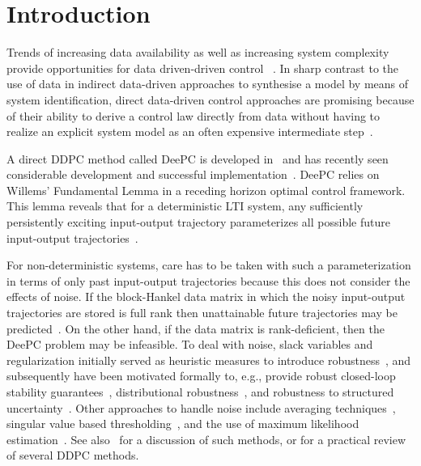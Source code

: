 \section{Introduction}\label{sec:introduction}
\noindent Trends of increasing data availability as well as increasing system complexity provide opportunities for data driven-driven control%
~\citep{Hou2013}. In sharp contrast to the use of data in %
indirect data-driven approaches to synthesise a model by means of system identification, direct data-driven control approaches are promising because of their ability to derive a control law directly from data without having to realize an explicit system model as an often expensive intermediate step~\citep{Hjalmarsson2005}.

A direct \ac{DDPC} method called \acf{DeePC} is developed in~\cite{Coulson2019} and has recently seen considerable development and successful implementation~\cite{Markovsky2023}. \ac{DeePC} relies on Willems' Fundamental Lemma in a receding horizon optimal control framework. This lemma reveals that for a deterministic \ac{LTI} system, any sufficiently persistently exciting input-output trajectory parameterizes all possible future input-output trajectories~\citep{Willems2005}.

For non-deterministic systems, care has to be taken with such a parameterization in terms of only past input-output trajectories because this does not consider the effects of noise. If the block-Hankel data matrix in which the noisy input-output trajectories are stored is full rank then unattainable future trajectories may be predicted~\citep{Markovsky2022}. On the other hand, if the data matrix is rank-deficient, then the \ac{DeePC} problem may be infeasible. To deal with noise, slack variables and regularization initially served as heuristic measures to introduce robustness~\citep{Coulson2019}, and subsequently have been motivated formally to, e.g., provide robust closed-loop stability guarantees~\citep{Berberich2021}, distributional robustness~\citep{Coulson2019a}, and robustness to structured uncertainty~\citep{Huang2023}. Other approaches to handle noise include averaging techniques~\citep{Jo2022}, singular value based thresholding~\citep{Sassella2022}, and the use of maximum likelihood estimation~\citep{Yin2023}. See also~\cite{Sassella2023} for a discussion of such methods, or \cite{Verheijen2023} for a practical review of several \ac{DDPC} methods.%

